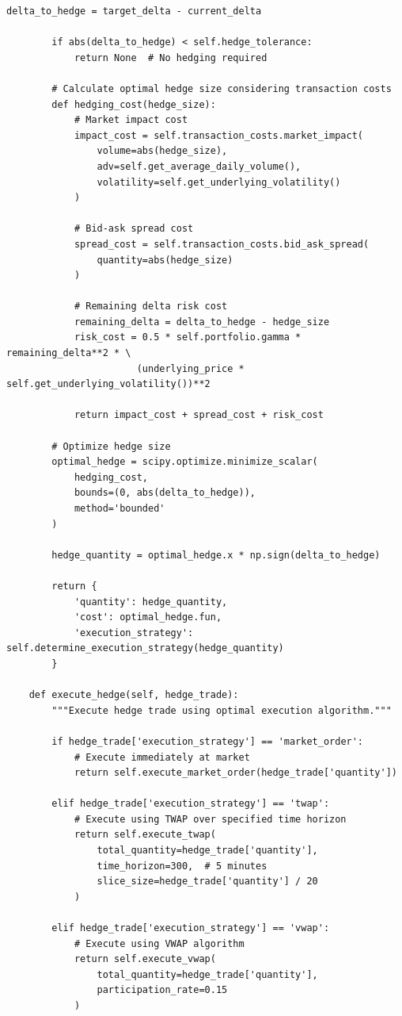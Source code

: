 \documentclass[12pt,a4paper]{article}
\theoremstyle{definition}
\theoremstyle{remark}
\begin{document}
\begin{lstlisting}[caption=Real-Time Delta Hedging]
        delta_to_hedge = target_delta - current_delta
        
        if abs(delta_to_hedge) < self.hedge_tolerance:
            return None  # No hedging required
        
        # Calculate optimal hedge size considering transaction costs
        def hedging_cost(hedge_size):
            # Market impact cost
            impact_cost = self.transaction_costs.market_impact(
                volume=abs(hedge_size),
                adv=self.get_average_daily_volume(),
                volatility=self.get_underlying_volatility()
            )
            
            # Bid-ask spread cost
            spread_cost = self.transaction_costs.bid_ask_spread(
                quantity=abs(hedge_size)
            )
            
            # Remaining delta risk cost
            remaining_delta = delta_to_hedge - hedge_size
            risk_cost = 0.5 * self.portfolio.gamma * remaining_delta**2 * \
                       (underlying_price * self.get_underlying_volatility())**2
            
            return impact_cost + spread_cost + risk_cost
        
        # Optimize hedge size
        optimal_hedge = scipy.optimize.minimize_scalar(
            hedging_cost,
            bounds=(0, abs(delta_to_hedge)),
            method='bounded'
        )
        
        hedge_quantity = optimal_hedge.x * np.sign(delta_to_hedge)
        
        return {
            'quantity': hedge_quantity,
            'cost': optimal_hedge.fun,
            'execution_strategy': self.determine_execution_strategy(hedge_quantity)
        }
    
    def execute_hedge(self, hedge_trade):
        """Execute hedge trade using optimal execution algorithm."""
        
        if hedge_trade['execution_strategy'] == 'market_order':
            # Execute immediately at market
            return self.execute_market_order(hedge_trade['quantity'])
        
        elif hedge_trade['execution_strategy'] == 'twap':
            # Execute using TWAP over specified time horizon
            return self.execute_twap(
                total_quantity=hedge_trade['quantity'],
                time_horizon=300,  # 5 minutes
                slice_size=hedge_trade['quantity'] / 20
            )
        
        elif hedge_trade['execution_strategy'] == 'vwap':
            # Execute using VWAP algorithm
            return self.execute_vwap(
                total_quantity=hedge_trade['quantity'],
                participation_rate=0.15
            )
\end{lstlisting}
\end{document}
